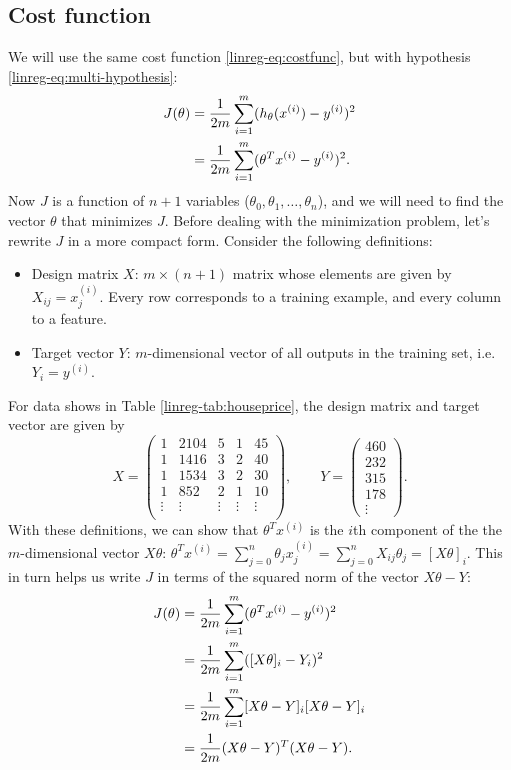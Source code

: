 \documentclass{article}
\theoremstyle{definition}
\begin{document}
\subsection{Cost function}
We will use the same cost function \eqref{linreg-eq:costfunc}, but with hypothesis \eqref{linreg-eq:multi-hypothesis}:
\begin{align}
    J(\theta) &= \frac{1}{2m}\sum_{i=1}^{m}(h_{\theta}(x^{(i)}) - y^{(i)})^2 \notag\\
    &= \frac{1}{2m}\sum_{i=1}^{m}(\theta^Tx^{(i)} - y^{(i)})^2.
    \label{linreg-eq:multi-costfunc}
\end{align}
Now $J$ is a function of $n+1$ variables ($\theta_0, \theta_1, \dots, \theta_n$), and we will need to find the vector $\theta$ that minimizes $J$. Before dealing with the minimization problem, let's rewrite $J$ in a more compact form. Consider the following definitions:
\begin{itemize}
    \item Design matrix $X$: $m \times (n+1)$ matrix whose elements are given by $X_{ij} = x^{(i)}_j$. Every row corresponds to a training example, and every column to a feature.
    \item Target vector $Y$: $m$-dimensional vector of all outputs in the training set, i.e. $Y_i=y^{(i)}$.
\end{itemize}
For data shows in Table \ref{linreg-tab:houseprice}, the design matrix and target vector are given by
\begin{equation}
    X =
    \begin{pmatrix}
        1 & 2104 & 5 & 1 & 45 \\
        1 & 1416 & 3 & 2 & 40 \\
        1 & 1534 & 3 & 2 & 30 \\
        1 & 852 & 2 & 1 & 10 \\
        \vdots & \vdots & \vdots & \vdots & \vdots \\
    \end{pmatrix},
    \qquad
    Y =
    \begin{pmatrix}
        460 \\
        232 \\
        315 \\
        178 \\
        \vdots
    \end{pmatrix}.
\end{equation}
With these definitions, we can show that $\theta^Tx^{(i)}$ is the $i$th component of the the $m$-dimensional vector $X\theta$: $\theta^Tx^{(i)}=\sum_{j=0}^n\theta_jx^{(i)}_j=\sum_{j=0}^nX_{ij}\theta_j=[X\theta]_i$. This in turn helps us write $J$ in terms of the squared norm of the vector $X\theta - Y$:
\begin{align}
    J(\theta) &= \frac{1}{2m}\sum_{i=1}^{m}(\theta^Tx^{(i)} - y^{(i)})^2\notag\\
    &= \frac{1}{2m}\sum_{i=1}^{m}([X\theta]_i - Y_i)^2\notag\\
    &= \frac{1}{2m}\sum_{i=1}^{m}[X\theta - Y]_i[X\theta - Y]_i\notag\\
    &= \frac{1}{2m}(X\theta - Y)^T(X\theta - Y).
    \label{linreg-eq:multi-costfunc-mat}
\end{align}
\end{document}
